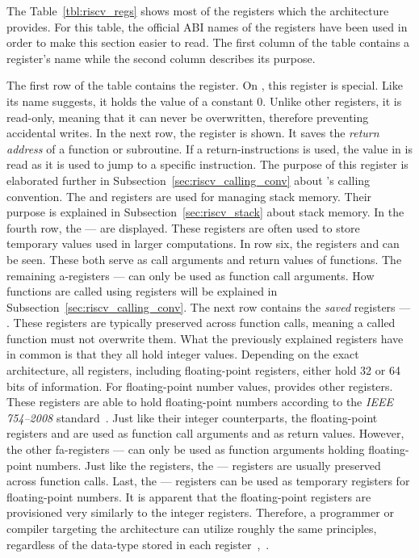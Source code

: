 The Table~\ref{tbl:riscv_regs} shows most of the registers which the \riscv{} architecture provides.
For this table, the official ABI names of the registers have been used in order to make this section easier to read.
The first column of the table contains a register's name while the second column describes its purpose.

The first row of the table contains the  register.
On \riscv{}, this register is special.
Like its name suggests, it holds the value of a constant 0.
Unlike other registers, it is read-only, meaning that it can never be overwritten, therefore preventing accidental writes.
In the next row, the  register is shown.
It saves the \emph{return address} of a function or subroutine.
If a return-instructions is used, the value in  is read as it is used to jump to a specific instruction.
The purpose of this register is elaborated further in Subsection~\ref{sec:riscv_calling_conv} about \riscv{}'s calling convention.
The  and  registers are used for managing stack memory.
Their purpose is explained in Subsection~\ref{sec:riscv_stack} about stack memory.
In the fourth row, the  —  are displayed.
These registers are often used to store temporary values used in larger computations.
In row six, the registers  and  can be seen.
These both serve as call arguments and return values of functions.
The remaining a-registers  —  can only be used as function call arguments.
How functions are called using registers will be explained in Subsection~\ref{sec:riscv_calling_conv}.
The next row contains the \emph{saved} registers  — .
These registers are typically preserved across function calls, meaning a called function must not overwrite them.
What the previously explained registers have in common is that they all hold integer values.
Depending on the exact \riscv{} architecture, all registers, including floating-point registers, either hold 32 or 64 bits of information.
For floating-point number values, \riscv{} provides other registers.
These registers are able to hold floating-point numbers according to the \emph{IEEE 754--2008} standard~\cite[Chapter~11]{Waterman2019}.
Just like their integer counterparts, the floating-point registers  and  are used as function call arguments and as return values.
However, the other fa-registers  —  can only be used as function arguments holding floating-point numbers.
Just like the  registers, the  —  registers are usually preserved across function calls.
Last, the  —  registers can be used as temporary registers for floating-point numbers.
It is apparent that the floating-point registers are provisioned very similarly to the integer registers.
Therefore, a programmer or compiler targeting the architecture can utilize roughly the same principles,
regardless of the data-type stored in each register~\cite[pp.~18f,p.~34]{Patterson2017},~\cite[p.~155]{Waterman2019}.

